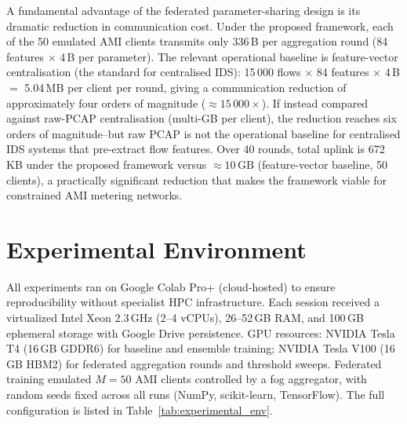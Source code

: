 \documentclass[sensors,article,submit,pdftex,moreauthors]{Definitions/mdpi}
\begin{document}
A fundamental advantage of the federated parameter-sharing design is its dramatic reduction in communication cost. Under the proposed framework, each of the 50 emulated AMI clients transmits only 336\,B per aggregation round (84 features $\times$ 4\,B per parameter). The relevant operational baseline is feature-vector centralisation (the standard for centralised IDS): 15\,000 flows $\times$ 84 features $\times$ 4\,B $=$ 5.04\,MB per client per round, giving a communication reduction of approximately four orders of magnitude (${\approx}15\,000\times$). If instead compared against raw-PCAP centralisation (multi-GB per client), the reduction reaches six orders of magnitude--but raw PCAP is not the operational baseline for centralised IDS systems that pre-extract flow features. Over 40 rounds, total uplink is 672\,KB under the proposed framework versus ${\approx}10\,\mathrm{GB}$ (feature-vector baseline, 50 clients), a practically significant reduction that makes the framework viable for constrained AMI metering networks.

\section{Experimental Environment}\label{r5}

All experiments ran on Google Colab Pro+ (cloud-hosted) to ensure reproducibility without specialist HPC infrastructure. Each session received a virtualized Intel Xeon 2.3\,GHz (2--4 vCPUs), 26--52\,GB RAM, and 100\,GB ephemeral storage with Google Drive persistence. GPU resources: NVIDIA Tesla T4 (16\,GB GDDR6) for baseline and ensemble training; NVIDIA Tesla V100 (16\,GB HBM2) for federated aggregation rounds and threshold sweeps. Federated training emulated $M{=}50$ AMI clients controlled by a fog aggregator, with random seeds fixed across all runs (NumPy, scikit-learn, TensorFlow). The full configuration is listed in Table~\ref{tab:experimental_env}.
\end{document}
